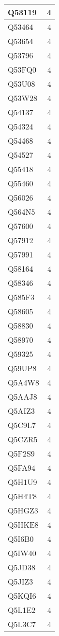 \documentclass[
]{book}
\theoremstyle{definition}
\theoremstyle{definition}
\theoremstyle{definition}
\theoremstyle{definition}
\theoremstyle{remark}
\begin{document}
\begin{table}
\begin{tabular}{l|r}
\hline
Q53119 & 4\\
\hline
Q53464 & 4\\
\hline
Q53654 & 4\\
\hline
Q53796 & 4\\
\hline
Q53FQ0 & 4\\
\hline
Q53U08 & 4\\
\hline
Q53W28 & 4\\
\hline
Q54137 & 4\\
\hline
Q54324 & 4\\
\hline
Q54468 & 4\\
\hline
Q54527 & 4\\
\hline
Q55418 & 4\\
\hline
Q55460 & 4\\
\hline
Q56026 & 4\\
\hline
Q564N5 & 4\\
\hline
Q57600 & 4\\
\hline
Q57912 & 4\\
\hline
Q57991 & 4\\
\hline
Q58164 & 4\\
\hline
Q58346 & 4\\
\hline
Q585F3 & 4\\
\hline
Q58605 & 4\\
\hline
Q58830 & 4\\
\hline
Q58970 & 4\\
\hline
Q59325 & 4\\
\hline
Q59UP8 & 4\\
\hline
Q5A4W8 & 4\\
\hline
Q5AAJ8 & 4\\
\hline
Q5AIZ3 & 4\\
\hline
Q5C9L7 & 4\\
\hline
Q5CZR5 & 4\\
\hline
Q5F2S9 & 4\\
\hline
Q5FA94 & 4\\
\hline
Q5H1U9 & 4\\
\hline
Q5H4T8 & 4\\
\hline
Q5HGZ3 & 4\\
\hline
Q5HKE8 & 4\\
\hline
Q5I6B0 & 4\\
\hline
Q5IW40 & 4\\
\hline
Q5JD38 & 4\\
\hline
Q5JIZ3 & 4\\
\hline
Q5KQI6 & 4\\
\hline
Q5L1E2 & 4\\
\hline
Q5L3C7 & 4\\

\end{tabular}
\end{table}
\end{document}
